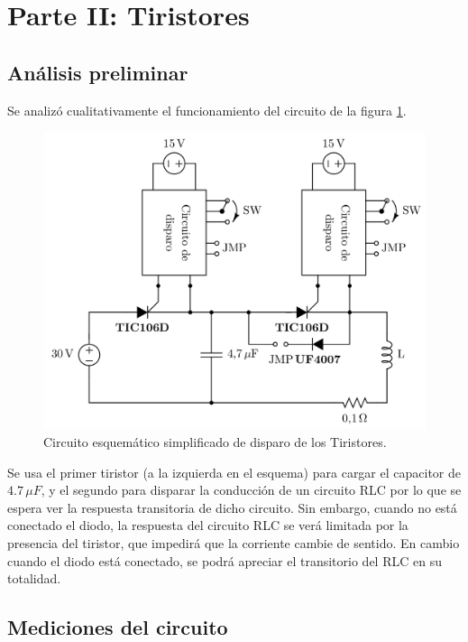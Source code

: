 \documentclass[10pt,spanish,a4paper,openany,notitlepage]{article}
\begin{document}
\section{Parte II: Tiristores}

\subsection{Análisis preliminar}

Se analizó cualitativamente el funcionamiento del circuito de la figura
\ref{fig:tiristores}.

\begin{figure}[H]
\centering
\includegraphics[scale=0.3]{./imagenes/tiristores.png}
\caption{Circuito esquemático simplificado de disparo de los Tiristores.}
\label{fig:tiristores}
\end{figure}

Se usa el primer tiristor (a la izquierda en el esquema) para cargar el 
capacitor de $4.7\,\unit{\mu F}$, y el segundo para disparar la conducción 
de un circuito RLC por lo que se espera ver la respuesta transitoria de 
dicho circuito.
Sin embargo, cuando no está conectado el diodo, la respuesta del circuito 
RLC se verá limitada por la presencia del tiristor, que impedirá que 
la corriente cambie de sentido. En cambio cuando el diodo está conectado, 
se podrá apreciar el transitorio del RLC en su totalidad.

\subsection{Mediciones del circuito}
\end{document}
